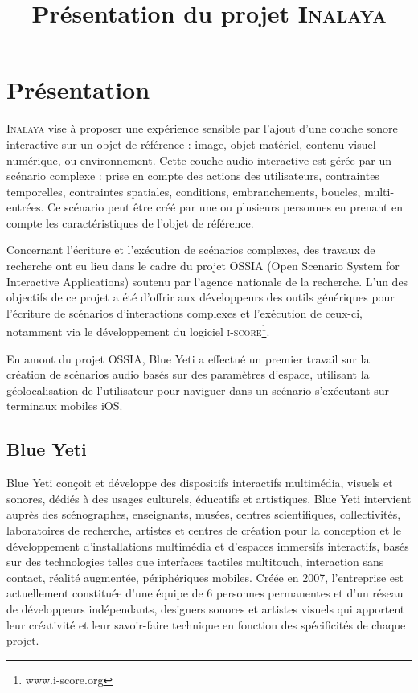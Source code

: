 \documentclass[french]{article}
\title{Présentation du projet \textsc{Inalaya}}
\date{}
\begin{document}
    \maketitle
    \section*{Présentation}
    \textsc{Inalaya} vise à proposer une expérience sensible par l’ajout d’une couche sonore interactive sur 
    un objet de référence : image, objet matériel, contenu visuel numérique, ou environnement.
    Cette couche audio interactive est gérée par un scénario complexe : prise en compte 
    des  actions des utilisateurs, contraintes temporelles, contraintes spatiales, conditions, 
    embranchements, boucles, multi-entrées. 
    Ce scénario peut être créé par une ou plusieurs personnes en prenant en compte les caractéristiques de l’objet de référence.
    
    Concernant l’écriture et l’exécution de scénarios complexes, des travaux de recherche ont eu lieu 
    dans le cadre du projet \textsc{OSSIA} (Open Scenario System for Interactive Applications) soutenu 
    par l’agence nationale de la recherche.
    L’un des objectifs de ce projet a été d’offrir aux développeurs des outils génériques pour l’écriture de scénarios d’interactions complexes et l’exécution de ceux-ci, notamment via le développement du logiciel \textsc{i-score}\footnote{www.i-score.org}.
    
    En amont du projet OSSIA, Blue Yeti a effectué un premier travail sur la création de scénarios 
    audio basés sur des paramètres d’espace, utilisant la géolocalisation de l’utilisateur pour 
    naviguer dans un scénario s’exécutant sur terminaux mobiles iOS. 
    
    \subsection*{Blue Yeti}
    Blue Yeti conçoit et développe des dispositifs interactifs multimédia, visuels et sonores, dédiés à des usages culturels, éducatifs et artistiques.
    Blue Yeti intervient auprès des scénographes, enseignants, musées, centres scientifiques, collectivités, laboratoires de recherche, artistes et centres de création pour la conception et le développement d'installations multimédia et d’espaces immersifs interactifs, basés sur des technologies telles que interfaces tactiles multitouch, interaction sans contact, réalité augmentée, périphériques mobiles.
    Créée en 2007, l'entreprise est actuellement constituée d’une équipe de 6 personnes permanentes et d’un réseau de développeurs indépendants, designers sonores et artistes visuels qui apportent leur créativité et leur savoir-faire technique en fonction des spécificités de chaque projet.
    
\end{document}
